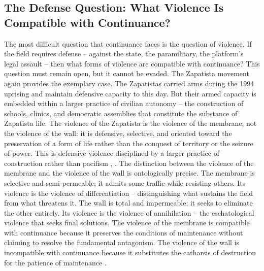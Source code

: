 \subsection{The Defense Question: What Violence Is Compatible with Continuance?}

The most difficult question that continuance faces is the question of violence. If the field requires defense – against the state, the paramilitary, the platform’s legal assault – then what forms of violence are compatible with continuance? This question must remain open, but it cannot be evaded. The Zapatista movement again provides the exemplary case. The Zapatistas carried arms during the 1994 uprising and maintain defensive capacity to this day. But their armed capacity is embedded within a larger practice of civilian autonomy – the construction of schools, clinics, and democratic assemblies that constitute the substance of Zapatista life. The violence of the Zapatista is the violence of the membrane, not the violence of the wall: it is defensive, selective, and oriented toward the preservation of a form of life rather than the conquest of territory or the seizure of power. This is defensive violence disciplined by a larger practice of construction rather than pacifism \cite{marcos_1995}, \cite{esteva_2014}. The distinction between the violence of the membrane and the violence of the wall is ontologically precise. The membrane is selective and semi-permeable; it admits some traffic while resisting others. Its violence is the violence of differentiation – distinguishing what sustains the field from what threatens it. The wall is total and impermeable; it seeks to eliminate the other entirely. Its violence is the violence of annihilation – the eschatological violence that seeks final solutions. The violence of the membrane is compatible with continuance because it preserves the conditions of maintenance without claiming to resolve the fundamental antagonism. The violence of the wall is incompatible with continuance because it substitutes the catharsis of destruction for the patience of maintenance \cite{esposito_2002}.

